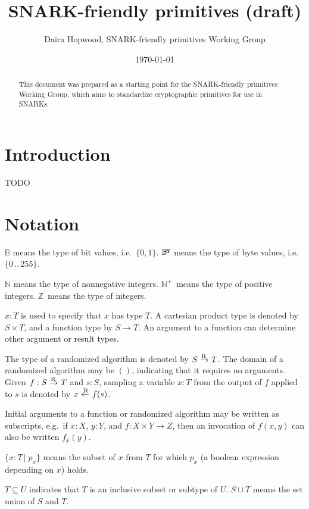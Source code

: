 \documentclass{article}
\newcommand{\doctitle}{SNARK-friendly primitives (draft)}
\newcommand{\docauthors}{Daira Hopwood, SNARK-friendly primitives Working Group}
\newcommand{\typecolon}{:}
\newcommand{\bit}{\mathbb{B}}
\newcommand{\overlap}[2]{\rlap{#2}\hspace{#1}{#2}}
\newcommand{\byte}{\mathbb{B}\kern -0.1em\raisebox{0.48ex}{\overlap{0.0001em}{\scalebox{0.7}{$\mathbb{Y}$}}}}
\newcommand{\Nat}{\mathbb{N}}
\newcommand{\PosInt}{\mathbb{N}^+}
\newcommand{\Int}{\mathbb{Z}}
\newcommand{\setof}[1]{\{{#1}\}}
\newcommand{\barerange}[2]{{{#1}\,..\,{#2}}}
\newcommand{\range}[2]{\setof{\barerange{#1}{#2}}}
\newcommand{\clasp}[3][0pt]{\stackengine{0pt}{#3}{\kern#1#2}{O}{c}{F}{F}{L}}
\newcommand{\rightarrowR}{\mathop{\clasp[-0.18em]{\raisebox{1.15ex}{\scriptsize R}}{$\,\rightarrow\,$}}}
\newcommand{\leftarrowR}{\mathop{\clasp[0.15em]{\raisebox{1.15ex}{\scriptsize R}}{$\,\leftarrow\,$}}}
\newcommand{\union}{\cup}
\newcommand{\suchthat}{\,\vert\;}
\begin{document}
\title{\doctitle}
\author{\docauthors}
\date{\today}
\maketitle

\begin{abstract}
This document was prepared as a starting point for the SNARK-friendly primitives Working Group,
which aims to standardize cryptographic primitives for use in SNARKs.
\end{abstract}


\section{Introduction} \label{introduction}

TODO

\section{Notation} \label{notation}

$\bit$ means the type of bit values, i.e.\ $\setof{0, 1}$.
$\byte$ means the type of byte values, i.e.\ $\range{0}{255}$.

$\Nat$ means the type of nonnegative integers. $\PosInt$~means
the type of positive integers. $\Int$~means the type of integers.

$x \typecolon T$ is used to specify that $x$ has type $T$.
A cartesian product type is denoted by $S \times T$, and a function type
by $S \rightarrow T$. An argument to a function can determine other argument
or result types.

The type of a randomized algorithm is denoted by $S \rightarrowR T$.
The domain of a randomized algorithm may be $()$, indicating that it requires
no arguments. Given $f \typecolon S \rightarrowR T$ and $s \typecolon S$,
sampling a variable $x \typecolon T$ from the output of $f$ applied to $s$
is denoted by $x \leftarrowR f(s)$.

Initial arguments to a function or randomized algorithm may be
written as subscripts, e.g.\ if $x \typecolon X$, $y \typecolon Y$, and
$f \typecolon X \times Y \rightarrow Z$, then an invocation of
$f(x, y)$ can also be written $f_x(y)$.

$\setof{x \typecolon T \suchthat p_x}$ means the subset of $x$ from $T$
for which $p_x$ (a boolean expression depending on $x$) holds.

$T \subseteq U$ indicates that $T$ is an inclusive subset or subtype of $U$.
$S \union T$ means the set union of $S$ and $T$.
\end{document}
